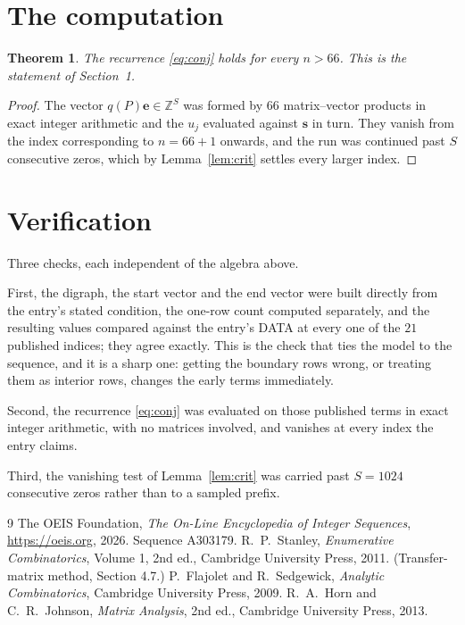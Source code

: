 \documentclass[11pt,a4paper]{article}
\theoremstyle{plain}
\newtheorem{theorem}{Theorem}
\theoremstyle{definition}
\begin{document}
\section{The computation}

\begin{theorem}
The recurrence \eqref{eq:conj} holds for every $n>66$. This is the statement of
Section~1.
\end{theorem}

\begin{proof}
The vector $q(P)\mathbf{e}\in\mathbb{Z}^{S}$ was formed by $66$ matrix--vector
products in exact integer arithmetic and the $u_j$ evaluated against $\mathbf{s}$ in turn.
They vanish from the index corresponding to $n=66+1$ onwards, and the run was continued
past $S$ consecutive zeros, which by Lemma~\ref{lem:crit} settles every larger index.
\end{proof}

\section{Verification}

Three checks, each independent of the algebra above.

First, the digraph, the start vector and the end vector were built directly from the
entry's stated condition, the one-row count computed separately, and the resulting values
compared against the entry's DATA at every one of the $21$ published indices; they
agree exactly. This is the check that ties the model to the sequence, and it is a sharp one:
getting the boundary rows wrong, or treating them as interior rows, changes the early terms
immediately.

Second, the recurrence \eqref{eq:conj} was evaluated on those published terms in exact
integer arithmetic, with no matrices involved, and vanishes at every index the entry claims.

Third, the vanishing test of Lemma~\ref{lem:crit} was carried past $S=1024$ consecutive
zeros rather than to a sampled prefix.

\begin{thebibliography}{9}
 The OEIS Foundation, \emph{The On-Line Encyclopedia of Integer
Sequences}, \url{https://oeis.org}, 2026. Sequence A303179.
 R.~P.~Stanley, \emph{Enumerative Combinatorics}, Volume 1, 2nd ed.,
Cambridge University Press, 2011. (Transfer-matrix method, Section 4.7.)
 P.~Flajolet and R.~Sedgewick, \emph{Analytic Combinatorics}, Cambridge
University Press, 2009.
 R.~A.~Horn and C.~R.~Johnson, \emph{Matrix Analysis}, 2nd ed., Cambridge
University Press, 2013.
\end{thebibliography}
\end{document}
